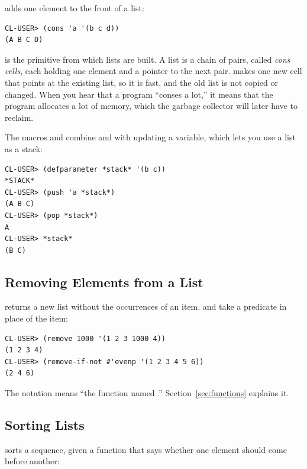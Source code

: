  adds one element to the front of a list:

\begin{verbatim}
CL-USER> (cons 'a '(b c d))
(A B C D)
\end{verbatim}

 is the primitive from which lists are built. A list is a
chain of pairs, called \emph{cons cells}, each holding one element
and a pointer to the next pair.  makes one new cell that
points at the existing list, so it is fast, and the old list is not
copied or changed. When you hear that a program ``conses a lot,''
it means that the program allocates a lot of memory, which the garbage
collector will later have to reclaim.

The macros  and  combine  and
 with updating a variable, which lets you use a list as a
stack:

\begin{verbatim}
CL-USER> (defparameter *stack* '(b c))
*STACK*
CL-USER> (push 'a *stack*)
(A B C)
CL-USER> (pop *stack*)
A
CL-USER> *stack*
(B C)
\end{verbatim}

\subsection{Removing Elements from a List}

 returns a new list without the occurrences of an item.
 and  take a predicate in place of
the item:

\begin{verbatim}
CL-USER> (remove 1000 '(1 2 3 1000 4))
(1 2 3 4)
CL-USER> (remove-if-not #'evenp '(1 2 3 4 5 6))
(2 4 6)
\end{verbatim}

The notation  means ``the function named
.'' Section~\ref{sec:functions} explains it.

\subsection{Sorting Lists}

 sorts a sequence, given a function that says whether one
element should come before another:

